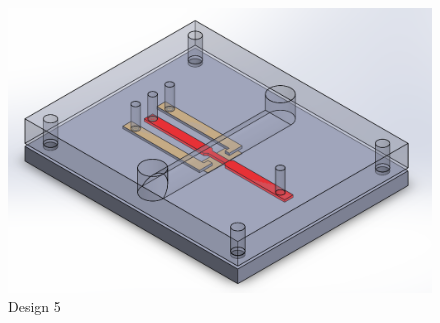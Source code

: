 \begin{figure}[H]
    \centering
    \includegraphics[scale = 0.3]{images/Design4}
    \caption{Design 5}
    \label{fig:design4}
\end{figure}


